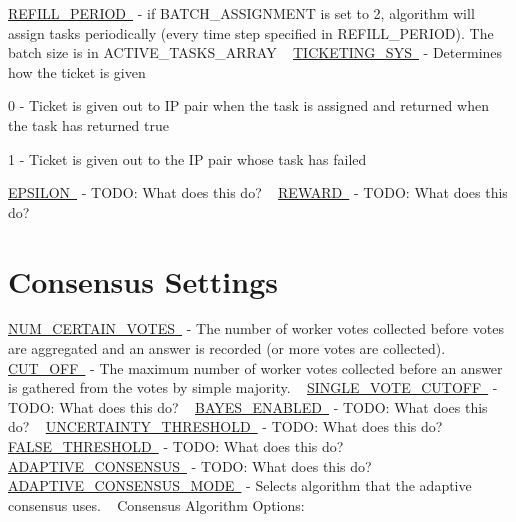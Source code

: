 \mbox{\hyperlink{}{R\+E\+F\+I\+L\+L\+\_\+\+P\+E\+R\+I\+OD }} -\/ if B\+A\+T\+C\+H\+\_\+\+A\+S\+S\+I\+G\+N\+M\+E\+NT is set to 2, algorithm will assign tasks periodically (every time step specified in R\+E\+F\+I\+L\+L\+\_\+\+P\+E\+R\+I\+OD). The batch size is in A\+C\+T\+I\+V\+E\+\_\+\+T\+A\+S\+K\+S\+\_\+\+A\+R\+R\+AY ~\newline
 \mbox{\hyperlink{}{T\+I\+C\+K\+E\+T\+I\+N\+G\+\_\+\+S\+YS }} -\/ Determines how the ticket is given ~\newline

\begin{DoxyItemize}
\item 0 -\/ Ticket is given out to IP pair when the task is assigned and returned when the task has returned true
\item 1 -\/ Ticket is given out to the IP pair whose task has failed
\end{DoxyItemize}

\mbox{\hyperlink{}{E\+P\+S\+I\+L\+ON }} -\/ T\+O\+DO\+: What does this do? ~\newline
 \mbox{\hyperlink{}{R\+E\+W\+A\+RD }} -\/ T\+O\+DO\+: What does this do? ~\newline
 \hypertarget{toggles_voteGetting}{}\section{Consensus Settings}\label{toggles_voteGetting}
\mbox{\hyperlink{}{N\+U\+M\+\_\+\+C\+E\+R\+T\+A\+I\+N\+\_\+\+V\+O\+T\+ES }} -\/ The number of worker votes collected before votes are aggregated and an answer is recorded (or more votes are collected). ~\newline
 \mbox{\hyperlink{}{C\+U\+T\+\_\+\+O\+FF }} -\/ The maximum number of worker votes collected before an answer is gathered from the votes by simple majority. ~\newline
 \mbox{\hyperlink{}{S\+I\+N\+G\+L\+E\+\_\+\+V\+O\+T\+E\+\_\+\+C\+U\+T\+O\+FF }} -\/ T\+O\+DO\+: What does this do? ~\newline
 \mbox{\hyperlink{}{B\+A\+Y\+E\+S\+\_\+\+E\+N\+A\+B\+L\+ED }} -\/ T\+O\+DO\+: What does this do? ~\newline
 \mbox{\hyperlink{}{U\+N\+C\+E\+R\+T\+A\+I\+N\+T\+Y\+\_\+\+T\+H\+R\+E\+S\+H\+O\+LD }} -\/ T\+O\+DO\+: What does this do? ~\newline
 \mbox{\hyperlink{}{F\+A\+L\+S\+E\+\_\+\+T\+H\+R\+E\+S\+H\+O\+LD }} -\/ T\+O\+DO\+: What does this do? ~\newline
 \mbox{\hyperlink{}{A\+D\+A\+P\+T\+I\+V\+E\+\_\+\+C\+O\+N\+S\+E\+N\+S\+US }} -\/ T\+O\+DO\+: What does this do? ~\newline
 \mbox{\hyperlink{}{A\+D\+A\+P\+T\+I\+V\+E\+\_\+\+C\+O\+N\+S\+E\+N\+S\+U\+S\+\_\+\+M\+O\+DE }} -\/ Selects algorithm that the adaptive consensus uses. ~\newline
 Consensus Algorithm Options\+: ~\newline

